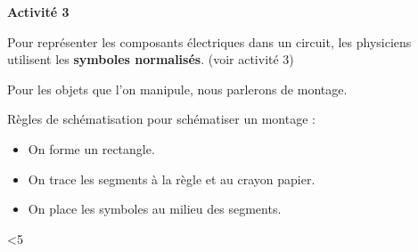 \documentclass[10pt]{article}
\newcommand{\titre}{Activité 3} %
\newcommand{\sep}{-2.5pt} %
\newcommand{\DoItNTimes}{5} %
\begin{document}
\thispagestyle{fancy}
\cfoot{}


\setcounter{int}{1}
\loop

\begin{mybox}{\textbf{\titre}}    
    \setlength\parindent{4pt} %
    \setlength\parskip{5pt} 

    Pour représenter les composants électriques dans un circuit, 
    les physiciens utilisent les \textbf{\color{DarkRed} {symboles normalisés}}. (voir activité 3)
    
    Pour les objets que l’on manipule, nous parlerons de montage.
    
    \begin{mybox}
        Règles de schématisation pour schématiser un montage :
        \begin{itemize}
            \item On forme un rectangle.
            \item On trace les segments à la règle et au crayon papier.
            \item On place les symboles au milieu des segments.    

        \end{itemize}    
    \end{mybox}
\end{mybox}

\vspace{\sep}

\addtocounter{int}{1}
\ifnum\value{int}<\DoItNTimes\repeat
\end{document}
